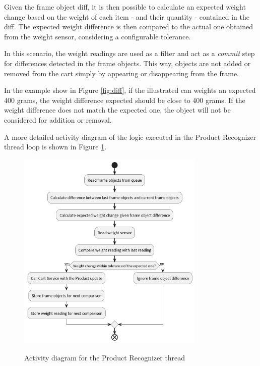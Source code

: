 Given the frame object diff, it is then possible to calculate an expected
weight change based on the weight of each item - and their quantity - contained
in the diff. The expected weight difference is then compared to the actual
one obtained from the weight sensor, considering a configurable tolerance.

In this scenario, the weight readings are used as a filter and act as a
\textit{commit} step for differences detected in the frame objects. This way, objects are not
added or removed from the cart simply by appearing or disappearing from the frame.

In the example show in Figure \ref{fig:diff}, if the illustrated can weights an expected 400 grams, the weight
difference expected should be close to 400 grams. If the weight difference does not match the expected
one, the object will not be considered for addition or removal. 

A more detailed activity diagram of the logic executed in the Product Recognizer thread loop is
shown in Figure \ref{fig:activity}.

\begin{figure}[H]
	\centering
	\caption[Activity diagram for the Product Recognizer thread]{Activity diagram for the Product Recognizer thread}
    \includegraphics[width=0.8\textwidth]{./images/Product Recognizer Activity.png}
	\fonte{}
    \label{fig:activity}
\end{figure}

